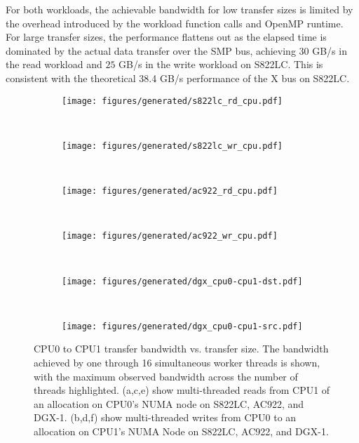 For both workloads, the achievable bandwidth for low transfer sizes is limited by the overhead introduced by the workload function calls and OpenMP runtime.
For large transfer sizes, the performance flattens out as the elapsed time is dominated by the actual data transfer over the SMP bus, achieving $30$ GB/s in the read workload and $25$ GB/s in the write workload on S822LC.
This is consistent with the theoretical 38.4 GB/s performance of the X bus on S822LC.

\begin{figure}[H]
	\centering
	\begin{subfigure}[b]{0.45\textwidth}
		\texttt{[image: figures/generated/s822lc\_rd\_cpu.pdf]}
		\caption{}
		\label{fig:s822lc-cpu0-cpu1-dst}
	\end{subfigure}
	~
	\begin{subfigure}[b]{0.45\textwidth}
		\texttt{[image: figures/generated/s822lc\_wr\_cpu.pdf]}
		\caption{}
		\label{fig:s822lc-cpu0-cpu1-src}
	\end{subfigure}
	\\
	\begin{subfigure}[b]{0.45\textwidth}
		\texttt{[image: figures/generated/ac922\_rd\_cpu.pdf]}
		\caption{}
		\label{fig:ac922-cpu0-cpu1-dst}
	\end{subfigure}
	~
	\begin{subfigure}[b]{0.45\textwidth}
		\texttt{[image: figures/generated/ac922\_wr\_cpu.pdf]}
		\caption{}
		\label{fig:ac922-cpu0-cpu1-src}
	\end{subfigure}
	\\
	\begin{subfigure}[b]{0.45\textwidth}
		\texttt{[image: figures/generated/dgx\_cpu0-cpu1-dst.pdf]}
		\caption{}
		\label{fig:dgx-cpu0-cpu1-dst}
	\end{subfigure}
	~
	\begin{subfigure}[b]{0.45\textwidth}
		\texttt{[image: figures/generated/dgx\_cpu0-cpu1-src.pdf]}
		\caption{}
		\label{fig:dgx-cpu0-cpu1-src}
	\end{subfigure}
	\caption[CPU0 to CPU1 transfer bandwidth]{
		CPU0 to CPU1 transfer bandwidth vs. transfer size.
		The bandwidth achieved by one through 16 simultaneous worker threads is shown, with the maximum observed bandwidth across the number of threads highlighted.
		(a,c,e) show multi-threaded reads from CPU1 of an allocation on CPU0's NUMA node on S822LC, AC922, and DGX-1.
		(b,d,f) show multi-threaded writes from CPU0 to an allocation on CPU1's NUMA Node on S822LC, AC922, and DGX-1.
	}
	\label{fig:cpu0-cpu1}
\end{figure}



